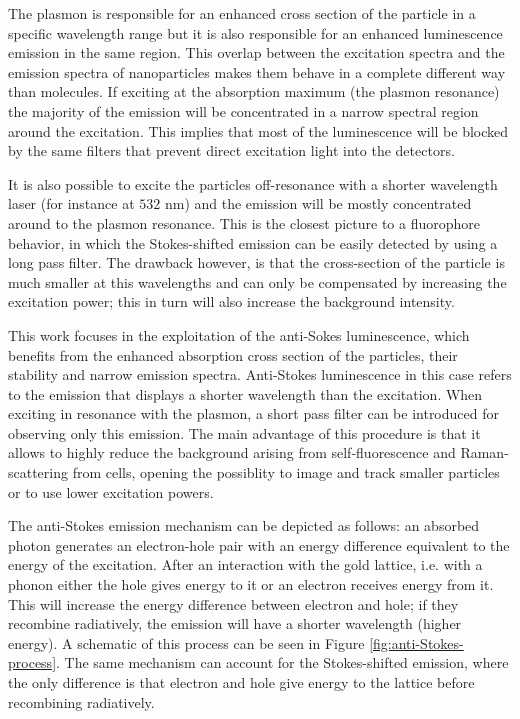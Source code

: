 \documentclass[journal=nalefd,manuscript=letter]{achemso}
\newcommand{\nm}{\ensuremath{\,\textrm{nm}}}
\begin{document}
The plasmon is responsible for an enhanced cross section of the particle in a
specific wavelength range but it is also responsible for an enhanced
luminescence emission in the same region. This overlap between the excitation
spectra and the emission spectra of nanoparticles makes them behave in a
complete different way than molecules. If exciting at the absorption maximum
(the plasmon resonance) the majority of the emission will be concentrated in a
narrow spectral region around the excitation. This implies that most of the
luminescence will be blocked by the same filters that prevent direct excitation
light into the detectors. 

It is also possible to excite the particles off-resonance with a
shorter wavelength laser (for instance at $532\,\nm$) and the emission will be
mostly concentrated around to the plasmon resonance. This is the closest picture
to a fluorophore behavior, in which the Stokes-shifted emission can be easily
detected by using a long pass filter. The drawback however, is that the
cross-section of the particle is much smaller at this wavelengths and can only
be compensated by increasing the excitation power; this in turn will also
increase the background intensity.

This work focuses in the exploitation of the anti-Sokes luminescence, which
benefits from the enhanced absorption cross section of the particles, their
stability and narrow emission spectra. Anti-Stokes luminescence in this case
refers to the emission that displays a shorter wavelength than the excitation.
When exciting in resonance with the plasmon, a short pass filter can be
introduced for observing only this emission. The main advantage of this
procedure is that it allows to highly reduce the background arising from
self-fluorescence and Raman-scattering from cells, opening the possiblity to
image and track smaller particles or to use lower excitation powers.

The anti-Stokes emission mechanism can be depicted as follows: an absorbed
photon generates an electron-hole pair with an energy difference equivalent to
the energy of the excitation. After an interaction with the gold lattice, i.e.
with a phonon either the hole gives energy to it or an electron receives energy
from it. This will increase the energy difference between electron and hole; if
they recombine radiatively, the emission will have a shorter wavelength (higher
energy). A schematic of this process can be seen in Figure
\ref{fig:anti-Stokes-process}. The same mechanism can account for the
Stokes-shifted emission, where the only difference is that electron and hole
give energy to the lattice before recombining radiatively.
\end{document}
